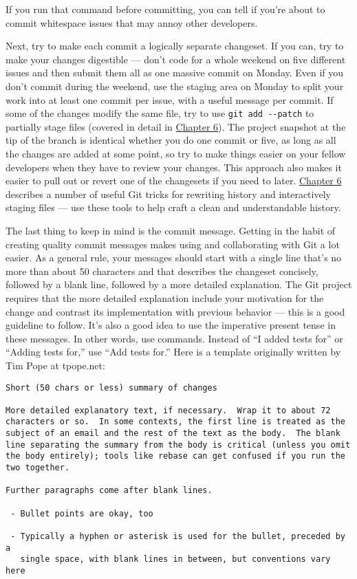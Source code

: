 \documentclass[a4paper]{book}
\newcommand{\prechap}{Chapter }
\newcommand{\postchap}{}
\newcommand{\chapref}[1]{\hyperref[chap:#1]{\prechap #1\postchap}}
\begin{document}
If you run that command before committing, you can tell if you're about to commit whitespace issues that may annoy other developers.

Next, try to make each commit a logically separate changeset. If you can, try to make your changes digestible --- don't code for a whole weekend on five different issues and then submit them all as one massive commit on Monday. Even if you don't commit during the weekend, use the staging area on Monday to split your work into at least one commit per issue, with a useful message per commit. If some of the changes modify the same file, try to use \texttt{git add -{}-patch} to partially stage files (covered in detail in \chapref{6}). The project snapshot at the tip of the branch is identical whether you do one commit or five, as long as all the changes are added at some point, so try to make things easier on your fellow developers when they have to review your changes. This approach also makes it easier to pull out or revert one of the changesets if you need to later. \chapref{6} describes a number of useful Git tricks for rewriting history and interactively staging files --- use these tools to help craft a clean and understandable history.

The last thing to keep in mind is the commit message. Getting in the habit of creating quality commit messages makes using and collaborating with Git a lot easier. As a general rule, your messages should start with a single line that's no more than about 50 characters and that describes the changeset concisely, followed by a blank line, followed by a more detailed explanation. The Git project requires that the more detailed explanation include your motivation for the change and contrast its implementation with previous behavior --- this is a good guideline to follow. It's also a good idea to use the imperative present tense in these messages. In other words, use commands. Instead of “I added tests for” or “Adding tests for,” use “Add tests for.” Here is a template originally written by Tim Pope at tpope.net:

\begin{shaded}\begin{verbatim}
Short (50 chars or less) summary of changes

More detailed explanatory text, if necessary.  Wrap it to about 72
characters or so.  In some contexts, the first line is treated as the
subject of an email and the rest of the text as the body.  The blank
line separating the summary from the body is critical (unless you omit
the body entirely); tools like rebase can get confused if you run the
two together.

Further paragraphs come after blank lines.

 - Bullet points are okay, too

 - Typically a hyphen or asterisk is used for the bullet, preceded by a
   single space, with blank lines in between, but conventions vary here
\end{verbatim}\end{shaded}
\end{document}
